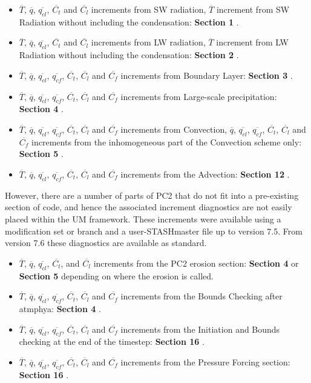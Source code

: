 \documentclass{UMDP_article}
\begin{document}
\begin{itemize}
\item{ $\overline{T}$, $\overline{q}$, $\overline{q_{cl}}$, $\overline{C_t}$ and $\overline{C_l}$ increments from SW radiation, $\overline{T}$ increment from SW Radiation without including the condensation: \textbf{Section 1} .}
\item{ $\overline{T}$, $\overline{q}$, $\overline{q_{cl}}$, $\overline{C_t}$ and $\overline{C_l}$ increments from LW radiation, $\overline{T}$ increment from LW Radiation without including the condensation: \textbf{Section 2} .}
\item{ $\overline{T}$, $\overline{q}$, $\overline{q_{cl}}$, $\overline{q_{cf}}$, $\overline{C_t}$, $\overline{C_l}$ and $\overline{C_f}$ increments from Boundary Layer: \textbf{Section 3} .}
\item{ $\overline{T}$, $\overline{q}$, $\overline{q_{cl}}$, $\overline{q_{cf}}$, $\overline{C_t}$, $\overline{C_l}$ and $\overline{C_f}$ increments from Large-scale precipitation: \textbf{Section 4} .}
\item{ $\overline{T}$, $\overline{q}$, $\overline{q_{cl}}$, $\overline{q_{cf}}$, $\overline{C_t}$, $\overline{C_l}$ and $\overline{C_f}$ increments from Convection, $\overline{q}$, $\overline{q_{cl}}$, $\overline{q_{cf}}$, $\overline{C_t}$, $\overline{C_l}$ and $\overline{C_f}$ increments from the inhomogeneous part of the Convection scheme only: \textbf{Section 5} .}
\item{ $\overline{T}$, $\overline{q}$, $\overline{q_{cl}}$, $\overline{q_{cf}}$, $\overline{C_t}$, $\overline{C_l}$ and $\overline{C_f}$ increments from the Advection: \textbf{Section 12} .}
\end{itemize}

However, there
are a number of parts of PC2 that do not fit into a pre-existing section of
code, and hence the associated increment diagnostics are not easily placed
within the UM framework. These increments were available using a
modification set or branch and a user-STASHmaster file up to version 7.5. From version 7.6 these diagnostics are available as standard.

\begin{itemize}
\item{ $\overline{T}$, $\overline{q}$, $\overline{q_{cl}}$, $\overline{C_t}$, and $\overline{C_l}$ increments from the PC2 erosion section: \textbf{Section 4} or {\bf Section 5} depending on where the erosion is called.}
\item{ $\overline{T}$, $\overline{q}$, $\overline{q_{cl}}$, $\overline{q_{cf}}$, $\overline{C_t}$, $\overline{C_l}$ and $\overline{C_f}$ increments from the Bounds Checking after atmphya: \textbf{Section 4} .}
\item{ $\overline{T}$, $\overline{q}$, $\overline{q_{cl}}$, $\overline{q_{cf}}$, $\overline{C_t}$, $\overline{C_l}$ and $\overline{C_f}$ increments from the Initiation and Bounds checking at the end of the timestep: \textbf{Section 16} .}
\item{ $\overline{T}$, $\overline{q}$, $\overline{q_{cl}}$, $\overline{q_{cf}}$, $\overline{C_t}$, $\overline{C_l}$ and $\overline{C_f}$ increments from the Pressure Forcing section: \textbf{Section 16} .}
\end{itemize}
\end{document}
